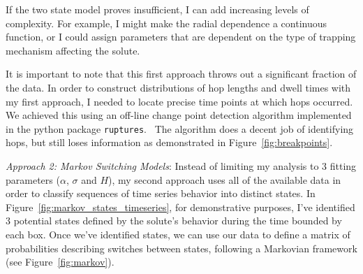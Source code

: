 \documentclass{article}
\begin{document}
  If the two state model proves insufficient, I can add increasing levels of
  complexity. For example, I might make the radial dependence a continuous 
  function, or I could assign parameters that are dependent on the type of
  trapping mechanism affecting the solute.
  
  It is important to note that this first approach throws out a significant fraction
  of the data. In order to construct distributions of hop lengths and dwell 
  times with my first approach, I needed to locate precise time points at which
  hops occurred. We achieved this using an off-line change point detection algorithm implemented
  in the python package \texttt{ruptures}.~\cite{truong_review_2018} The 
  algorithm does a decent job of identifying hops, but still loses information
  as demonstrated in Figure~\ref{fig:breakpoints}. 

  \textit{Approach 2: Markov Switching Models}: Instead of limiting my 
  analysis to 3 fitting parameters ($\alpha$, $\sigma$ and $H$), my second
  approach uses all of the available data in order to classify sequences
  of time series behavior into distinct states. In 
  Figure~\ref{fig:markov_states_timeseries}, for demonstrative purposes,
  I've identified 3 potential states defined by the solute's behavior 
  during the time bounded by each box. Once we've identified states, we 
  can use our data to define a matrix of probabilities describing switches
  between states, following a Markovian framework (see Figure~\ref{fig:markov}).~\cite{howard_dynamic_1960}
  
\end{document}
